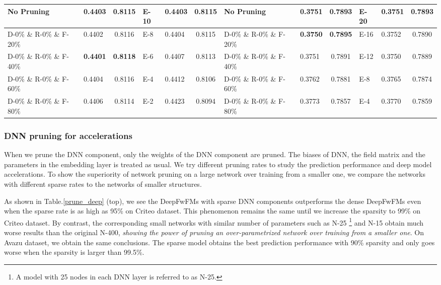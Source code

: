 \documentclass[sigconf]{acmart}
\begin{document}
\begin{table*}
\begin{tabular}{llc|llc||llc|llc}
    \bottomrule
    \midrule
    No Pruning   &  0.4403  & 0.8115 & E-10 & 0.4403  & 0.8115 & No Pruning   &  0.3751 & 0.7893  & E-20 &  0.3751 & 0.7893   \\
    \midrule
     D-0\% \& R-0\% \& F-20\%  &   0.4402 & 0.8116   & E-8 & 0.4404 & 0.8115 &  D-0\% \& R-0\% \& F-20\% &  \textbf{0.3750} & \textbf{0.7895} & E-16 & 0.3752 & 0.7890    \\
     D-0\% \& R-0\% \& F-40\%  & \textbf{0.4401}  &  \textbf{{0.8118}} & E-6  & 0.4407 & 0.8113 & D-0\% \& R-0\% \& F-40\% & 0.3751 & 0.7891 & E-12 & 0.3750 & 0.7889  \\
     D-0\% \& R-0\% \& F-60\%  &  0.4404  & 0.8116  & E-4 & 0.4412 & 0.8106 &  D-0\% \& R-0\% \& F-60\% & 0.3762 & 0.7881 &  E-8 &   0.3765 & 0.7874  \\
     D-0\% \& R-0\% \& F-80\%  &  0.4406  & 0.8114  & E-2 & 0.4423 & 0.8094 &  D-0\% \& R-0\% \& F-80\% & 0.3773 & 0.7857 &  E-4 &   0.3770 & 0.7859  \\
    \bottomrule
  \end{tabular}
  \label{prune_deep}
  \vspace{1em}
\end{table*}



\subsubsection{\textbf{DNN pruning for accelerations}}
When we prune the DNN component, only the weights of the DNN component are pruned. The biases of DNN, the field matrix  and the parameters in the embedding layer is treated as usual. We try different pruning rates to study the prediction performance and deep model accelerations. To show the superiority of network pruning on a large network over training from a smaller one, we compare the networks with different sparse rates to the networks of smaller structures. 

As shown in Table.\ref{prune_deep} (top), we see the DeepFwFMs with sparse DNN components outperforms the dense DeepFwFMs even when the sparse rate is as high as 95\% on Criteo dataset. This phenomenon remains the same until we increase the sparsity to 99\% on Criteo dataset. By contrast, the corresponding small networks with similar number of parameters such as N-25 \footnote{A model with 25 nodes in each DNN layer is referred to as N-25.} and N-15 obtain much worse results than the original N-400, \emph{showing the power of pruning an over-parametrized network over training from a smaller one}. On Avazu dataset, we obtain the same conclusions. The sparse model obtains the best prediction performance with 90\% sparsity and only goes worse when the sparsity is larger than 99.5\%. 
\end{document}

